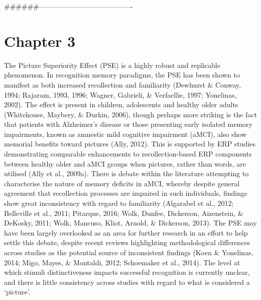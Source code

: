\documentclass[
  11pt,
]{article}
\begin{document}
\#\#\#\#\#\#----------------------------------------

\newpage

\hypertarget{chapter-3}{%
\section{Chapter 3}\label{chapter-3}}

The Picture Superiority Effect (PSE) is a highly robust and replicable
phenomenon. In recognition memory paradigms, the PSE has been shown to
manifest as both increased recollection and familiarity (Dewhurst \&
Conway, 1994; Rajaram, 1993, 1996; Wagner, Gabrieli, \& Verfaellie,
1997; Yonelinas, 2002). The effect is present in children, adolescents
and healthy older adults (Whitehouse, Maybery, \& Durkin, 2006), though
perhaps more striking is the fact that patients with Alzheimer's disease
or those presenting early isolated memory impairments, known as amnestic
mild cognitive impairment (aMCI), also show memorial benefits toward
pictures (Ally, 2012). This is supported by ERP studies demonstrating
comparable enhancements to recollection-based ERP components between
healthy older and aMCI groups when pictures, rather than words, are
utilised (Ally et al., 2009a). There is debate within the literature
attempting to characterise the nature of memory deficits in aMCI,
whereby despite general agreement that recollection processes are
impaired in such individuals, findings show great inconsistency with
regard to familiarity (Algarabel et al., 2012; Belleville et al., 2011;
Pitarque, 2016; Wolk, Dunfee, Dickerson, Aizenstein, \& DeKosky, 2011;
Wolk, Mancuso, Kliot, Arnold, \& Dickerson, 2013). The PSE may have been
largely overlooked as an area for further research in an effort to help
settle this debate, despite recent reviews highlighting methodological
differences across studies as the potential source of inconsistent
findings (Koen \& Yonelinas, 2014; Migo, Mayes, \& Montaldi, 2012;
Schoemaker et al., 2014). The level at which stimuli distinctiveness
impacts successful recognition is currently unclear, and there is little
consistency across studies with regard to what is considered a
`picture'.
\end{document}
